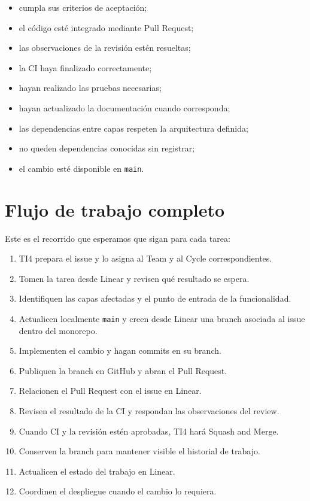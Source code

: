 \documentclass[11pt,a4paper]{article}
\begin{document}
\begin{itemize}
  \item cumpla sus criterios de aceptación;
  \item el código esté integrado mediante Pull Request;
  \item las observaciones de la revisión estén resueltas;
  \item la CI haya finalizado correctamente;
  \item hayan realizado las pruebas necesarias;
  \item hayan actualizado la documentación cuando corresponda;
  \item las dependencias entre capas respeten la arquitectura definida;
  \item no queden dependencias conocidas sin registrar;
  \item el cambio esté disponible en \texttt{main}.
\end{itemize}


\section{Flujo de trabajo completo}

Este es el recorrido que esperamos que sigan para cada tarea:

\begin{enumerate}
  \item TI4 prepara el issue y lo asigna al Team y al Cycle correspondientes.
  \item Tomen la tarea desde Linear y revisen qué resultado se espera.
  \item Identifiquen las capas afectadas y el punto de entrada de la
    funcionalidad.
  \item Actualicen localmente \texttt{main} y creen desde Linear una branch
    asociada al issue dentro del monorepo.
  \item Implementen el cambio y hagan commits en su branch.
  \item Publiquen la branch en GitHub y abran el Pull Request.
  \item Relacionen el Pull Request con el issue en Linear.
  \item Revisen el resultado de la CI y respondan las observaciones del review.
  \item Cuando CI y la revisión estén aprobadas, TI4 hará Squash and Merge.
  \item Conserven la branch para mantener visible el historial de trabajo.
  \item Actualicen el estado del trabajo en Linear.
  \item Coordinen el despliegue cuando el cambio lo requiera.
\end{enumerate}
\end{document}
